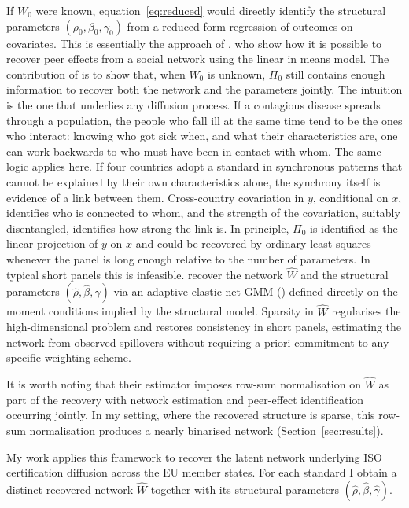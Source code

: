 \documentclass[12pt,a4paper]{article}
\begin{document}
If $W_0$ were known, equation~\eqref{eq:reduced} would directly identify the structural parameters $(\rho_0,\beta_0,\gamma_0)$ from a reduced-form regression of outcomes on covariates. This is essentially the approach of \citet{bramoulle2009}, who show how it is possible to recover peer effects from a social network using the \citet{manski1993} linear in means model. The contribution of \citet{depaula2025} is to show that, when $W_0$ is unknown, $\Pi_0$ still contains enough information to recover both the network and the parameters jointly. The intuition is the one that underlies any diffusion process. If a contagious disease spreads through a population, the people who fall ill at the same time tend to be the ones who interact: knowing who got sick when, and what their characteristics are, one can work backwards to who must have been in contact with whom. The same logic applies here. If four countries adopt a standard in synchronous patterns that cannot be explained by their own characteristics alone, the synchrony itself is evidence of a link between them. Cross-country covariation in $y$, conditional on $x$, identifies who is connected to whom, and the strength of the covariation, suitably disentangled, identifies how strong the link is. In principle, $\Pi_0$ is identified as the linear projection of $y$ on $x$ and could be recovered by ordinary least squares whenever the panel is long enough relative to the number of parameters. In typical short panels this is infeasible. \citet{depaula2025} recover the network $\hat W$ and the structural parameters $(\hat\rho, \hat\beta, \hat\gamma)$ via an adaptive elastic-net GMM (\citet{caner2014}) defined directly on the moment conditions implied by the structural model. Sparsity in $\hat W$ regularises the high-dimensional problem and restores consistency in short panels, estimating the network from observed spillovers without requiring a priori commitment to any specific weighting scheme.

It is worth noting that their estimator imposes row-sum normalisation on $\hat{W}$ as part of the recovery with  network estimation and peer-effect identification occurring jointly. In my setting, where the recovered structure is sparse, this row-sum normalisation produces a nearly binarised network (Section~\ref{sec:results}).

My work applies this framework to recover the latent network underlying ISO certification diffusion across the EU member states. For each standard I obtain a distinct recovered network $\hat W$ together with its structural parameters $(\hat\rho,\hat\beta,\hat\gamma)$.
\end{document}

